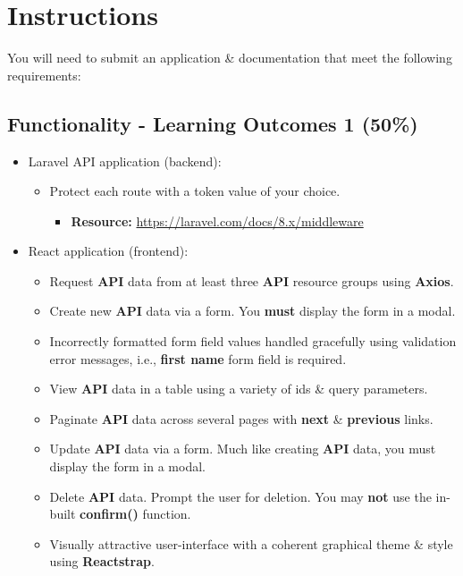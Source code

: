 \documentclass{article}
\begin{document}
\newpage

\section*{Instructions}
You will need to submit an application \& documentation that meet the following requirements:

\subsection*{Functionality - Learning Outcomes 1 (50\%)}

\begin{itemize}
	\item Laravel API application (backend):
	\begin{itemize}
		\item Protect each route with a token value of your choice.
		\begin{itemize}
			\item \textbf{Resource:} \footnotesize\href{https://laravel.com/docs/8.x/middleware}{https://laravel.com/docs/8.x/middleware}
		\end{itemize}
	\end{itemize}
	\item React application (frontend):
	\begin{itemize}
		\item Request \textbf{API} data from at least three \textbf{API} resource groups using \textbf{Axios}.
		\item Create new \textbf{API} data via a form. You \textbf{must} display the form in a modal.
		\item Incorrectly formatted form field values handled gracefully using validation error messages, i.e., \textbf{first name} form field is required.
		\item View \textbf{API} data in a table using a variety of ids \& query parameters. 
		\item Paginate \textbf{API} data across several pages with \textbf{next} \& \textbf{previous} links.
		\item Update \textbf{API} data via a form. Much like creating \textbf{API} data, you must display the form in a modal. 
		\item Delete \textbf{API} data. Prompt the user for deletion. You may \textbf{not} use the in-built \textbf{confirm()} function.
		\item Visually attractive user-interface with a coherent graphical theme \& style using \textbf{Reactstrap}.

\end{itemize}
\end{itemize}
\end{document}
